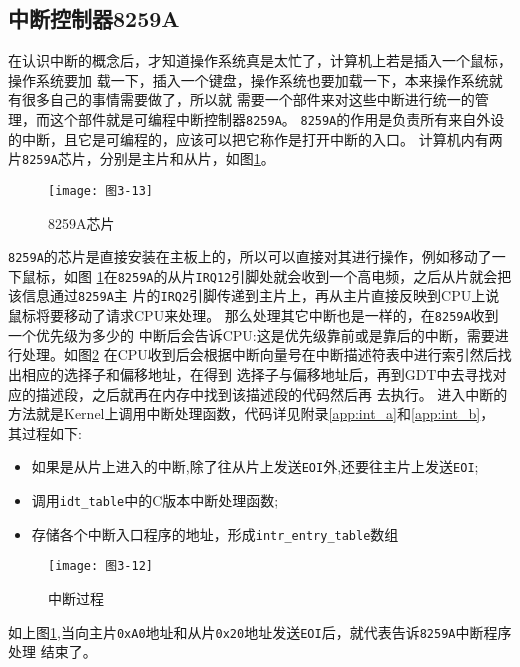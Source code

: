 \subsection{中断控制器8259A}

在认识中断的概念后，才知道操作系统真是太忙了，计算机上若是插入一个鼠标，操作系统要加
载一下，插入一个键盘，操作系统也要加载一下，本来操作系统就有很多自己的事情需要做了，所以就
需要一个部件来对这些中断进行统一的管理，而这个部件就是可编程中断控制器\texttt{8259A}。
\texttt{8259A}的作用是负责所有来自外设的中断，且它是可编程的，应该可以把它称作是打开中断的入口。
计算机内有两片\texttt{8259A}芯片，分别是主片和从片，如图\ref{fig:8259A}。

\begin{figure}[H]
  \centering
  \texttt{[image: 图3-13]}
  \caption{8259A芯片}
  \label{fig:8259A}
\end{figure}

\texttt{8259A}的芯片是直接安装在主板上的，所以可以直接对其进行操作，例如移动了一下鼠标，如图
\ref{fig:8259A}在\texttt{8259A}的从片\texttt{IRQ12}引脚处就会收到一个高电频，之后从片就会把该信息通过\texttt{8259A}主
片的\texttt{IRQ2}引脚传递到主片上，再从主片直接反映到CPU上说鼠标将要移动了请求CPU来处理。
那么处理其它中断也是一样的，在\texttt{8259A}收到一个优先级为多少的
中断后会告诉CPU:这是优先级靠前或是靠后的中断，需要进行处理。如图\ref{fig:interrupt_a}
在CPU收到后会根据中断向量号在中断描述符表中进行索引然后找出相应的选择子和偏移地址，在得到
选择子与偏移地址后，再到GDT中去寻找对应的描述段，之后就再在内存中找到该描述段的代码然后再
去执行。
进入中断的方法就是Kernel上调用中断处理函数，代码详见附录\ref{app:int_a}和\ref{app:int_b}，
其过程如下:

\begin{itemize}
\item 如果是从片上进入的中断,除了往从片上发送\texttt{EOI}外,还要往主片上发送\texttt{EOI};
\item 调用\texttt{idt\_table}中的C版本中断处理函数;
\item 存储各个中断入口程序的地址，形成\texttt{intr\_entry\_table}数组
\end{itemize}

\begin{figure}[H]
  \centering
  \texttt{[image: 图3-12]}
  \caption{中断过程}
  \label{fig:interrupt_a}
\end{figure}

如上图\ref{fig:8259A},当向主片\texttt{0xA0}地址和从片\texttt{0x20}地址发送\texttt{EOI}后，就代表告诉\texttt{8259A}中断程序处理
结束了。


